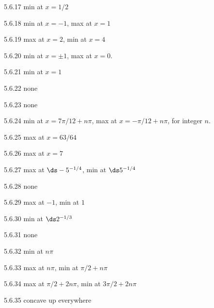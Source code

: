\begin{Answer}{5.6.17}
 min at $x=1/2$
\end{Answer}
\begin{Answer}{5.6.18}
 min at $x=-1$, max at $x=1$
\end{Answer}
\begin{Answer}{5.6.19}
 max at $x=2$, min at $x=4$
\end{Answer}
\begin{Answer}{5.6.20}
 min at $x=\pm 1$, max at $x=0$.
\end{Answer}
\begin{Answer}{5.6.21}
 min at $x=1$
\end{Answer}
\begin{Answer}{5.6.22}
 none
\end{Answer}
\begin{Answer}{5.6.23}
 none
\end{Answer}
\begin{Answer}{5.6.24}
 min at $x=7\pi/12+n\pi$, max at $x=-\pi/12+n\pi$, for integer $n$.
\end{Answer}
\begin{Answer}{5.6.25}
 max at $x=63/64$
\end{Answer}
\begin{Answer}{5.6.26}
 max at $x=7$
\end{Answer}
\begin{Answer}{5.6.27}
 max at $\ds -5^{-1/4}$, min at $\ds 5^{-1/4}$
\end{Answer}
\begin{Answer}{5.6.28}
 none
\end{Answer}
\begin{Answer}{5.6.29}
 max at $-1$, min at $1$
\end{Answer}
\begin{Answer}{5.6.30}
 min at $\ds 2^{-1/3}$
\end{Answer}
\begin{Answer}{5.6.31}
 none
\end{Answer}
\begin{Answer}{5.6.32}
 min at $n\pi$
\end{Answer}
\begin{Answer}{5.6.33}
 max at $n\pi$, min at $\pi/2+n\pi$
\end{Answer}
\begin{Answer}{5.6.34}
 max at $\pi/2+2n\pi$, min at $3\pi/2+2n\pi$
\end{Answer}
\begin{Answer}{5.6.35}
 concave up everywhere
\end{Answer}
